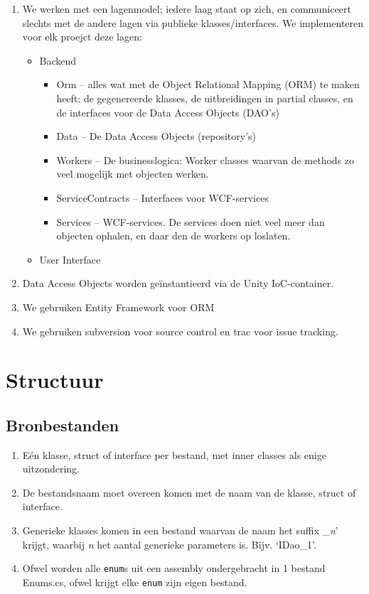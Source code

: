 \documentclass[a4paper,11pt]{article}
\begin{document}
\begin{enumerate}
\item We werken met een lagenmodel; iedere laag staat op zich, en communiceert slechts met de
andere lagen via publieke klasses/interfaces.  We implementeren voor elk
proejct deze lagen:
\begin{itemize}
\item Backend
\begin{itemize}
\item Orm -- alles wat met de Object Relational Mapping (ORM) te
maken heeft: de gegenereerde klasses, de uitbreidingen in partial classes,
en de interfaces voor de Data Access Objects (DAO's)
\item Data -- De Data Access Objects (repository's)
\item Workers -- De businesslogica: Worker classes waarvan de methods zo
veel mogelijk met objecten werken.
\item ServiceContracts -- Interfaces voor WCF-services
\item Services -- WCF-services.  De services doen niet veel meer dan
objecten ophalen, en daar den de workers op loslaten.
\end{itemize}
\item User Interface
\end{itemize}
\item Data Access Objects worden ge\"instantieerd via de Unity
IoC-container.
\item We gebruiken Entity Framework voor ORM
\item We gebruiken subversion voor source control en trac voor issue
tracking.
\end{enumerate}

\section{Structuur}

\subsection{Bronbestanden}

\begin{enumerate}[resume]
\item E\'en klasse, struct of interface per bestand, met inner classes als enige uitzondering.
\item De bestandsnaam moet overeen komen met de naam van de klasse, struct
of interface.
\item Generieke klasses  komen in een bestand waarvan de naam het suffix
\_{\em n}' krijgt, waarbij {\em n} het aantal generieke parameters
is.  Bijv. `IDao\_1'.
\item Ofwel worden alle \lstinline !enum!s  uit een assembly ondergebracht
in 1 bestand Enums.cs, ofwel krijgt elke \lstinline !enum! zijn eigen
bestand.

\end{enumerate}
\end{document}

